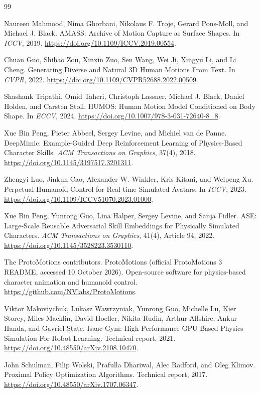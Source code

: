\begin{thebibliography}{99}

Naureen Mahmood, Nima Ghorbani, Nikolaus F. Troje, Gerard Pons-Moll,
and Michael J. Black.
AMASS: Archive of Motion Capture as Surface Shapes.
In \emph{ICCV}, 2019.
\url{https://doi.org/10.1109/ICCV.2019.00554}.

Chuan Guo, Shihao Zou, Xinxin Zuo, Sen Wang, Wei Ji, Xingyu Li,
and Li Cheng.
Generating Diverse and Natural 3D Human Motions From Text.
In \emph{CVPR}, 2022.
\url{https://doi.org/10.1109/CVPR52688.2022.00509}.

Shashank Tripathi, Omid Taheri, Christoph Lassner, Michael J. Black,
Daniel Holden, and Carsten Stoll.
HUMOS: Human Motion Model Conditioned on Body Shape.
In \emph{ECCV}, 2024.
\url{https://doi.org/10.1007/978-3-031-72640-8_8}.

Xue Bin Peng, Pieter Abbeel, Sergey Levine, and Michiel van de Panne.
DeepMimic: Example-Guided Deep Reinforcement Learning of Physics-Based
Character Skills.
\emph{ACM Transactions on Graphics}, 37(4), 2018.
\url{https://doi.org/10.1145/3197517.3201311}.

Zhengyi Luo, Jinkun Cao, Alexander W. Winkler, Kris Kitani, and Weipeng Xu.
Perpetual Humanoid Control for Real-time Simulated Avatars.
In \emph{ICCV}, 2023.
\url{https://doi.org/10.1109/ICCV51070.2023.01000}.

Xue Bin Peng, Yunrong Guo, Lina Halper, Sergey Levine, and Sanja Fidler.
ASE: Large-Scale Reusable Adversarial Skill Embeddings for Physically
Simulated Characters. \emph{ACM Transactions on Graphics}, 41(4), Article 94, 2022.
\url{https://doi.org/10.1145/3528223.3530110}.

The ProtoMotions contributors.
ProtoMotions (official ProtoMotions 3 README, accessed 10 October 2026).
Open-source software for physics-based character animation and humanoid control.
\url{https://github.com/NVlabs/ProtoMotions}.

Viktor Makoviychuk, Lukasz Wawrzyniak, Yunrong Guo, Michelle Lu, Kier Storey,
Miles Macklin, David Hoeller, Nikita Rudin, Arthur Allshire, Ankur Handa,
and Gavriel State.
Isaac Gym: High Performance GPU-Based Physics Simulation For Robot Learning.
Technical report, 2021.
\url{https://doi.org/10.48550/arXiv.2108.10470}.

John Schulman, Filip Wolski, Prafulla Dhariwal, Alec Radford, and Oleg Klimov.
Proximal Policy Optimization Algorithms.
Technical report, 2017.
\url{https://doi.org/10.48550/arXiv.1707.06347}.


\end{thebibliography}

